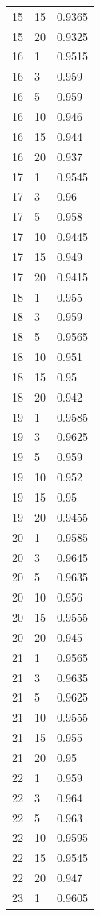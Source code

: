 \documentclass[runningheads]{llncs}
\begin{document}
\begin{longtable}{| p{} | p{} | p{} |}
15 & 15 & 0.9365 \\
15 & 20 & 0.9325 \\
16 & 1 & 0.9515 \\
16 & 3 & 0.959 \\
16 & 5 & 0.959 \\
16 & 10 & 0.946 \\
16 & 15 & 0.944 \\
16 & 20 & 0.937 \\
17 & 1 & 0.9545 \\
17 & 3 & 0.96 \\
17 & 5 & 0.958 \\
17 & 10 & 0.9445 \\
17 & 15 & 0.949 \\
17 & 20 & 0.9415 \\
18 & 1 & 0.955 \\
18 & 3 & 0.959 \\
18 & 5 & 0.9565 \\
18 & 10 & 0.951 \\
18 & 15 & 0.95 \\
18 & 20 & 0.942 \\
19 & 1 & 0.9585 \\
19 & 3 & 0.9625 \\
19 & 5 & 0.959 \\
19 & 10 & 0.952 \\
19 & 15 & 0.95 \\
19 & 20 & 0.9455 \\
20 & 1 & 0.9585 \\
20 & 3 & 0.9645 \\
20 & 5 & 0.9635 \\
20 & 10 & 0.956 \\
20 & 15 & 0.9555 \\
20 & 20 & 0.945 \\
21 & 1 & 0.9565 \\
21 & 3 & 0.9635 \\
21 & 5 & 0.9625 \\
21 & 10 & 0.9555 \\
21 & 15 & 0.955 \\
21 & 20 & 0.95 \\
22 & 1 & 0.959 \\
22 & 3 & 0.964 \\
22 & 5 & 0.963 \\
22 & 10 & 0.9595 \\
22 & 15 & 0.9545 \\
22 & 20 & 0.947 \\
23 & 1 & 0.9605 \\

\end{longtable}
\end{document}
